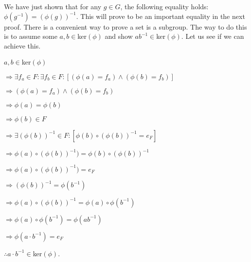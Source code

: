 \documentclass[12pt, a4paper]{article}
\begin{document}
    We have just shown that for any $g\in G$, the following equality holds: $\phi(g^{-1})=(\phi(g))^{-1}$. This will prove to be an important equality in the next proof. There is a convenient way to prove a set is a subgroup. The way to do this is to assume some $a,b\in$ker$(\phi)$ and show $ab^{-1}\in$ker$(\phi)$. Let us see if we can achieve this.\par
    
\newpage

\hspace{2mm} $a,b\in$ker$(\phi)$\par
\vspace{2mm}
\hspace{10mm} $\Rightarrow\exists f_a\in F\colon\exists f_b\in F\colon[(\phi(a)=f_a)\wedge(\phi(b)=f_b)]$\par
\vspace{2mm}
\hspace{10mm} $\Rightarrow(\phi(a)=f_a)\wedge(\phi(b)=f_b)$\par
\vspace{2mm}
\hspace{10mm} $\Rightarrow\phi(a)=\phi(b)$\par
\vspace{2mm}
\hspace{10mm} $\Rightarrow\phi(b)\in F$\par
\vspace{2mm}
\hspace{10mm} $\Rightarrow\exists(\phi(b))^{-1}\in F\colon[\phi(b)\circ(\phi(b))^{-1}=e_F]$\par
\vspace{2mm}
\hspace{10mm} $\Rightarrow\phi(a)\circ(\phi(b))^{-1})=\phi(b)\circ(\phi(b))^{-1}$\par
\vspace{2mm}
\hspace{10mm} $\Rightarrow\phi(a)\circ(\phi(b))^{-1})=e_F$\par
\vspace{2mm}
\hspace{10mm} $\Rightarrow(\phi(b))^{-1}=\phi(b^{-1})$\par
\vspace{2mm}
\hspace{10mm} $\Rightarrow\phi(a)\circ(\phi(b))^{-1}=\phi(a)\circ\phi(b^{-1})$\par
\vspace{2mm}
\hspace{10mm} $\Rightarrow\phi(a)\circ\phi(b^{-1})=\phi(ab^{-1})$\par
\vspace{2mm}
\hspace{10mm} $\Rightarrow\phi(a\cdot b^{-1})=e_F$\par
\vspace{2mm}
\hspace{2mm} $\therefore a\cdot b^{-1}\in$ker$(\phi)$.\par
\vspace{4mm}
\end{document}
